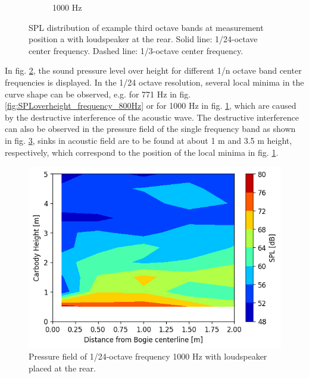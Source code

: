 \begin{figure}[H]
\begin{subfigure}[b]{0.48\textwidth}
        \caption{1000 Hz}
        \label{fig:SPLoverheight_frequency_1000Hz}
    \end{subfigure}
    \caption{SPL distribution of example third octave bands at measurement position a with loudspeaker at the rear. Solid line: 1/24-octave center frequency. Dashed line: 1/3-octave center frequency.}
    \label{fig:SPLoverheight_frequency}
\end{figure}

\noindent In fig. \ref{fig:SPLoverheight_frequency}, the sound pressure level over height for different 1/n octave band center frequencies is displayed. In the 1/24 octave resolution, several local minima in the curve shape can be observed, e.g. for 771 Hz in fig. \ref{fig:SPLoverheight_frequency_800Hz} or for 1000 Hz in fig. \ref{fig:SPLoverheight_frequency_1000Hz}, which are caused by the destructive interference of the acoustic wave. The destructive interference can also be observed in the pressure field of the single frequency band as shown in fig. \ref{fig:pressurefield_1000Hz}, sinks in acoustic field are to be found at about 1 m and 3.5 m height, respectively, which correspond to the position of the local minima in fig. \ref{fig:SPLoverheight_frequency_1000Hz}.

\begin{figure}[H]
    \centering
    \includegraphics[width=0.6\linewidth]{fig/pressure_field_1000Hz.png}
    \caption{Pressure field of 1/24-octave frequency 1000 Hz with loudspeaker placed at the rear.}
    \label{fig:pressurefield_1000Hz}
\end{figure}
